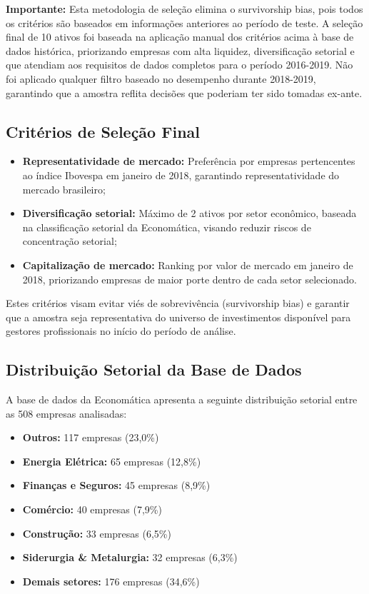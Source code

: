 \textbf{Importante:} Esta metodologia de seleção elimina o survivorship bias, pois todos os critérios são baseados em informações anteriores ao período de teste. A seleção final de 10 ativos foi baseada na aplicação manual dos critérios acima à base de dados histórica, priorizando empresas com alta liquidez, diversificação setorial e que atendiam aos requisitos de dados completos para o período 2016-2019. Não foi aplicado qualquer filtro baseado no desempenho durante 2018-2019, garantindo que a amostra reflita decisões que poderiam ter sido tomadas ex-ante.

\subsection{Critérios de Seleção Final}

\begin{itemize}
    \item \textbf{Representatividade de mercado:} Preferência por empresas pertencentes ao índice Ibovespa em janeiro de 2018, garantindo representatividade do mercado brasileiro;
    
    \item \textbf{Diversificação setorial:} Máximo de 2 ativos por setor econômico, baseada na classificação setorial da Economática, visando reduzir riscos de concentração setorial;
    
    \item \textbf{Capitalização de mercado:} Ranking por valor de mercado em janeiro de 2018, priorizando empresas de maior porte dentro de cada setor selecionado.
\end{itemize}

Estes critérios visam evitar viés de sobrevivência (survivorship bias) e garantir que a amostra seja representativa do universo de investimentos disponível para gestores profissionais no início do período de análise.

\subsection{Distribuição Setorial da Base de Dados}

A base de dados da Economática apresenta a seguinte distribuição setorial entre as 508 empresas analisadas:

\begin{itemize}
    \item \textbf{Outros:} 117 empresas (23,0\%)
    \item \textbf{Energia Elétrica:} 65 empresas (12,8\%)
    \item \textbf{Finanças e Seguros:} 45 empresas (8,9\%)
    \item \textbf{Comércio:} 40 empresas (7,9\%)
    \item \textbf{Construção:} 33 empresas (6,5\%)
    \item \textbf{Siderurgia \& Metalurgia:} 32 empresas (6,3\%)
    \item \textbf{Demais setores:} 176 empresas (34,6\%)
\end{itemize}

